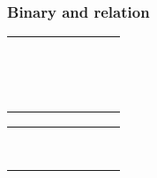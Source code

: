 \subsubsection*{Binary and relation}
\begin{longtable}{l l | l l | ll | ll}
  \codeshowD{<}{>} & \codeshowD{=}{\doteq}\\
  \codeshowD{\leq}{\geq} & \codeshowD{\equiv}{\approx}\\
  \codeshowD{\ll}{\gg} & \codeshowD{\cong}{\simeq}\\
  \codeshowD{\subset}{\supset} & \codeshowD{\sim}{\propto}\\
  \codeshowD{\subseteq}{\supseteq} & \codeshowD{\parallel}{\nparallel}\\
  \codeshowD{\nsubseteq}{\nsupseteq} & \codeshowD{\asymp}{\bowtie}\\
  \codeshowD{\sqsubset}{\sqsupset} & \codeshowD{\vdash}{\dashv}\\
  \codeshowD{\sqsubseteq}{\sqsupseteq} & \codeshowD{\smile}{\frown}\\
  \codeshowD{\preceq}{\succeq} & \codeshowD{\prec}{\succ}\\
  \codeshowD{\in}{\ni} & \codeshowD{\notin}{\neq}\\
  \codeshowD{\mid}{\perp} & \codeshowD{\models}{\therefore}\\
  \codeshowD{\sphericalangle}{\measuredangle} & \codeshowD{\leqslant}{\geqslant}\\
  \codeshowD{\subsetneq}{\varsubsetneq} & \codeshowD{\subsetneqq}{\subseteqq}\\
  \codeshowD{\nleq}{\ngeq} & \codeshowD{\nsim}{\nleqslant}\\
\end{longtable}
\begin{longtable}{l l | l l | ll | ll}
  \codeshowD{\pm}{\mp}& \codeshowD{\cup}{\cap}\\
  \codeshowD{\div}{\times}&\codeshowD{\vee}{\wedge}\\
  \codeshowD{\ast}{\star}&\codeshowD{\sqcup}{\sqcap}\\
  \codeshowD{\setminus}{\smallsetminus}&\codeshowD{\uplus}{\wr}\\
  
  \codeshowD{\dagger}{\ddagger}&\codeshowD{\bigtriangleup}{\bigtriangledown}\\
  \codeshowD{\cdot}{\odot}&\codeshowD{\triangleleft}{\diamond}\\
  \codeshowD{\oplus}{\ominus}&\codeshowD{\circ}{\amalg}\\
  \codeshowD{\oslash}{\otimes}&\codeshowD{\bigcirc}{\bullet}
\end{longtable}
